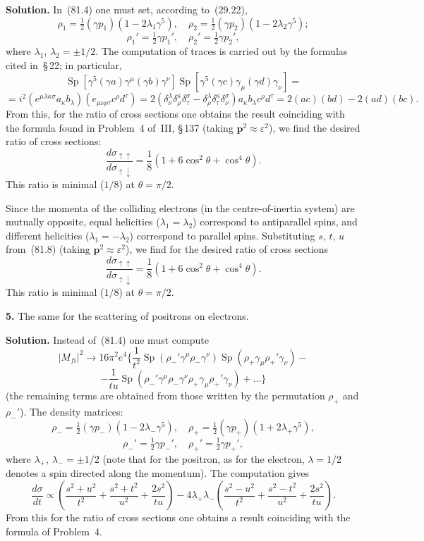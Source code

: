\textbf{Solution.} In~(81.4) one must set, according to~(29.22),
\[
\rho_1 = \tfrac{1}{2}(\gamma p_1)(1-2\lambda_1\gamma^5),\quad \rho_2 = \tfrac{1}{2}(\gamma p_2)(1-2\lambda_2\gamma^5);
\]
\[
\rho_1' = \tfrac{1}{2}\gamma p_1',\quad \rho_2' = \tfrac{1}{2}\gamma p_2',
\]
where $\lambda_1$, $\lambda_2 = \pm 1/2$. The computation of traces is carried out by the formulas cited in~\S\,22; in particular,
\[
\operatorname{Sp}[\gamma^5(\gamma a)\gamma^\mu(\gamma b)\gamma^\nu]\operatorname{Sp}[\gamma^5(\gamma c)\gamma_\mu(\gamma d)\gamma_\nu] =
\]
\[
= i^2(e^{\mu\lambda\kappa\sigma}a_\kappa b_\lambda)(e_{\mu\nu\rho\tau}c^\rho d^\tau) = 2(\delta^\lambda_\nu\delta^\kappa_\rho\delta^\sigma_\tau - \delta^\lambda_\rho\delta^\kappa_\tau\delta^\sigma_\nu)a_\kappa b_\lambda c^\rho d^\tau = 2(ac)(bd) - 2(ad)(bc).
\]
From this, for the ratio of cross sections one obtains the result coinciding with the formula found in Problem~4 of~III, \S\,137 (taking $\mathbf{p}^2 \approx \varepsilon^2$), we find the desired ratio of cross sections:
\begin{equation}
\frac{d\sigma_{\uparrow\uparrow}}{d\sigma_{\uparrow\downarrow}} = \frac{1}{8}(1+6\cos^2\theta + \cos^4\theta).
\tag{1}
\end{equation}
This ratio is minimal ($1/8$) at $\theta = \pi/2$.

Since the momenta of the colliding electrons (in the centre-of-inertia system) are mutually opposite, equal helicities ($\lambda_1 = \lambda_2$) correspond to antiparallel spins, and different helicities ($\lambda_1 = -\lambda_2$) correspond to parallel spins. Substituting $s$, $t$, $u$ from~(81.8) (taking $\mathbf{p}^2 \approx \varepsilon^2$), we find for the desired ratio of cross sections
\[
\frac{d\sigma_{\uparrow\uparrow}}{d\sigma_{\uparrow\downarrow}} = \frac{1}{8}(1 + 6\cos^2\theta + \cos^4\theta).
\]
This ratio is minimal ($1/8$) at $\theta = \pi/2$.

\textbf{5.} The same for the scattering of positrons on electrons.

\textbf{Solution.} Instead of~(81.4) one must compute
\[
|M_{fi}|^2 \to 16\pi^2 e^4\bigg\{\frac{1}{t^2}\operatorname{Sp}(\rho_-'\gamma^\mu\rho_-\gamma^\nu)\operatorname{Sp}(\rho_+\gamma_\mu\rho_+'\gamma_\nu) -
\]
\[
-\frac{1}{tu}\operatorname{Sp}(\rho_-'\gamma^\mu\rho_-\gamma^\nu\rho_+\gamma_\mu\rho_+'\gamma_\nu) + \ldots
\bigg\}
\]
(the remaining terms are obtained from those written by the permutation $\rho_+$ and $\rho_-'$). The density matrices:
\[
\rho_- = \tfrac{1}{2}(\gamma p_-)(1-2\lambda_-\gamma^5),\quad \rho_+ = \tfrac{1}{2}(\gamma p_+)(1+2\lambda_+\gamma^5),
\]
\[
\rho_-' = \tfrac{1}{2}\gamma p_-',\quad \rho_+' = \tfrac{1}{2}\gamma p_+',
\]
where $\lambda_+$, $\lambda_- = \pm 1/2$ (note that for the positron, as for the electron, $\lambda = 1/2$ denotes a spin directed along the momentum). The computation gives
\[
\frac{d\sigma}{dt} \propto \left(\frac{s^2+u^2}{t^2}+\frac{s^2+t^2}{u^2}+\frac{2s^2}{tu}\right) - 4\lambda_+\lambda_-\left(\frac{s^2-u^2}{t^2}+\frac{s^2-t^2}{u^2}+\frac{2s^2}{tu}\right).
\]
From this for the ratio of cross sections one obtains a result coinciding with the formula of Problem~4.

